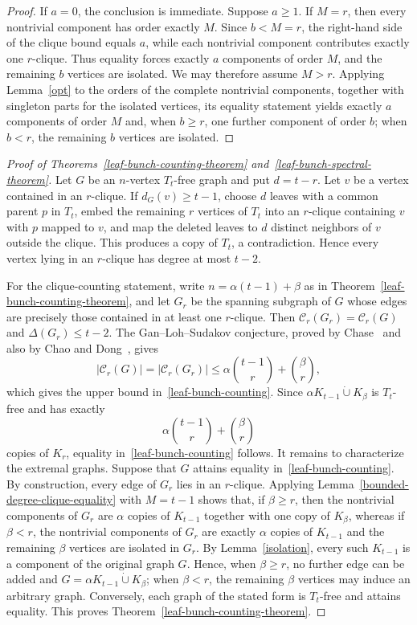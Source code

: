 \documentclass[11pt,a4paper]{article}
\newcommand{\dunion}{\mathbin{\dot\cup}}
\begin{document}
\begin{proof}
If $a=0$, the conclusion is immediate. Suppose $a\ge1$. If $M=r$, then every nontrivial component has order exactly $M$. Since $b<M=r$, the right-hand side of the clique bound equals $a$, while each nontrivial component contributes exactly one $r$-clique. Thus equality forces exactly $a$ components of order $M$, and the remaining $b$ vertices are isolated. We may therefore assume $M>r$. Applying Lemma~\ref{opt} to the orders of the complete nontrivial components, together with singleton parts for the isolated vertices, its equality statement yields exactly $a$ components of order $M$ and, when $b\ge r$, one further component of order $b$; when $b<r$, the remaining $b$ vertices are isolated.
\end{proof}

\begin{proof}[Proof of Theorems~\ref{leaf-bunch-counting-theorem} and~\ref{leaf-bunch-spectral-theorem}]
Let $G$ be an $n$-vertex $T_t$-free graph and put $d=t-r$. Let $v$ be a vertex contained in an $r$-clique. If $d_G(v)\ge t-1$, choose $d$ leaves with a common parent $p$ in $T_t$, embed the remaining $r$ vertices of $T_t$ into an $r$-clique containing $v$ with $p$ mapped to $v$, and map the deleted leaves to $d$ distinct neighbors of $v$ outside the clique. This produces a copy of $T_t$, a contradiction. Hence every vertex lying in an $r$-clique has degree at most $t-2$.

For the clique-counting statement, write $n=\alpha(t-1)+\beta$ as in Theorem~\ref{leaf-bunch-counting-theorem}, and let $G_r$ be the spanning subgraph of $G$ whose edges are precisely those contained in at least one $r$-clique. Then $\mathcal C_r(G_r)=\mathcal C_r(G)$ and $\Delta(G_r)\le t-2$. The Gan--Loh--Sudakov conjecture, proved by Chase~\cite{chase2020} and also by Chao and Dong~\cite{Chao2022}, gives
\[
|\mathcal C_r(G)|=|\mathcal C_r(G_r)|
\le \alpha\binom{t-1}{r}+\binom{\beta}{r},
\]
which gives the upper bound in~\eqref{leaf-bunch-counting}. Since $\alpha K_{t-1}\dunion K_\beta$ is $T_t$-free and has exactly
\[
\alpha\binom{t-1}{r}+\binom{\beta}{r}
\]
copies of $K_r$, equality in~\eqref{leaf-bunch-counting} follows. It remains to characterize the extremal graphs. Suppose that $G$ attains equality in~\eqref{leaf-bunch-counting}. By construction, every edge of $G_r$ lies in an $r$-clique. Applying Lemma~\ref{bounded-degree-clique-equality} with $M=t-1$ shows that, if $\beta\ge r$, then the nontrivial components of $G_r$ are $\alpha$ copies of $K_{t-1}$ together with one copy of $K_\beta$, whereas if $\beta<r$, the nontrivial components of $G_r$ are exactly $\alpha$ copies of $K_{t-1}$ and the remaining $\beta$ vertices are isolated in $G_r$. By Lemma~\ref{isolation}, every such $K_{t-1}$ is a component of the original graph $G$. Hence, when $\beta\ge r$, no further edge can be added and $G=\alpha K_{t-1}\dunion K_\beta$; when $\beta<r$, the remaining $\beta$ vertices may induce an arbitrary graph. Conversely, each graph of the stated form is $T_t$-free and attains equality. This proves Theorem~\ref{leaf-bunch-counting-theorem}.


\end{proof}
\end{document}
